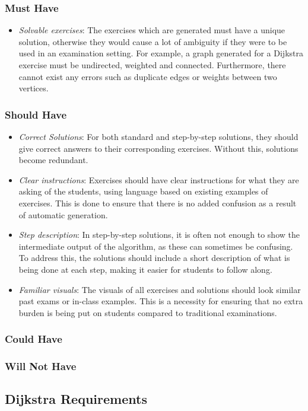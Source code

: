 \documentclass{l4proj}
\begin{document}
\subsubsection{Must Have}
\begin{itemize}
	\item
	\emph{Solvable exercises}: The exercises which are generated must have a unique solution, otherwise they would cause a lot of ambiguity if they were to be used in an examination setting. For example, a graph generated for a Dijkstra exercise must be undirected, weighted and connected. Furthermore, there cannot exist any errors such as duplicate edges or weights between two vertices.
\end{itemize}
\subsubsection{Should Have}
\begin{itemize}
	\item
	\emph{Correct Solutions}: For both standard and step-by-step solutions, they should give correct answers to their corresponding exercises. Without this, solutions become redundant.
	\item
	\emph{Clear instructions}: Exercises should have clear instructions for what they are asking of the students, using language based on existing examples of exercises. This is done to ensure that there is no added confusion as a result of automatic generation.
	\item
	\emph{Step description}: In step-by-step solutions, it is often not enough to show the intermediate output of the algorithm, as these can sometimes be confusing. To address this, the solutions should include a short description of what is being done at each step, making it easier for students to follow along. 
	\item
	\emph{Familiar visuals}: The visuals of all exercises and solutions should look similar past exams or in-class examples. This is a necessity for ensuring that no extra burden is being put on students compared to traditional examinations. 
\end{itemize}
\subsubsection{Could Have}
\subsubsection{Will Not Have}
\subsection{Dijkstra Requirements}
\label{sec:dijkr}
\end{document}
